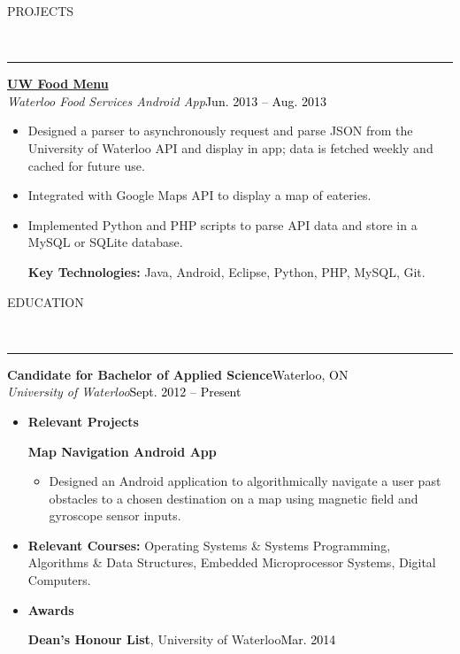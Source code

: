 \documentclass[11pt, letterpaper, oneside]{article}
\newcommand{\HRule}[2]{\textcolor{#1}{\rule{\linewidth}{#2}}}
\newcommand{\sectiontitle}[1]{\begin{minipage}{\textwidth}\vspace{-7.5pt}\begin{flushleft}\hspace{-20.5pt}\vspace{-25pt}
\Large\MakeUppercase{#1}\end{flushleft}\end{minipage}\\\HRule{black}{0.15mm}\vspace{\baselineskip}}
\newenvironment{ressection}[1]{
  \sectiontitle{#1}}
  {\vspace{-\baselineskip}}
\newcommand{\resentryheader}[4]{
    \vspace{-6pt}
    \textbf{#1}\hspace{\stretch{1}}\textcolor{black}{#3}\\
    \textit{#2}\hspace{\stretch{1}}\textcolor{black}{#4}\\
}
\newcommand{\resitem}[1]{
    \vspace{2pt}
    \item \begin{flushleft} #1 \end{flushleft}
}
\newcommand{\resinneritem}[1]{
	\vspace{-5pt}
    \item \begin{flushleft} #1 \end{flushleft}
}
\newcommand{\resawardentry}[3]{
  \begin{minipage}{6.3in}
  \hspace{-24pt}\textbf{#1},
  {#2}\hfill\textcolor{black}{#3}\\
  \vspace{-5pt}
  \vspace{0.5\baselineskip}
  \end{minipage}
}
\newenvironment{resentry}[4]{
  \begin{minipage}{\textwidth}
  \vspace{-3pt}
    \resentryheader{#1}{#2}{#3}{#4}
        \vspace{-\baselineskip}
    \begin{itemize}[noitemsep,nolistsep]
}{
    \end{itemize}
        \vspace{\baselineskip}
        \end{minipage}
}
\begin{document}
\begin{ressection}{Projects}
  \begin{resentry}{\href{https://play.google.com/store/apps/details?id=ca.uwaterloo.uwfoodservices&hl=en}{UW Food Menu}}{Waterloo Food Services Android App}{}{Jun. 2013 -- Aug. 2013}
    \resitem{Designed a parser to asynchronously request and parse JSON from the University of Waterloo API and display in app; data is fetched weekly and cached for future use.}
    \resitem{Integrated with Google Maps API to display a map of eateries.}
    \resitem{Implemented Python and PHP scripts to parse API data and store in a MySQL or SQLite database.}
    \vspace{4pt} \hspace{-15pt}
    \textbf{Key Technologies:} Java, Android, Eclipse, Python, PHP, MySQL, Git.
  \end{resentry}
\end{ressection}

\begin{ressection}{Education}
  \begin{resentry}{Candidate for Bachelor of Applied Science}{University of Waterloo}{Waterloo, ON}{Sept. 2012 -- Present}
    \resitem{\textbf{Relevant Projects}}
	\textbf{\hspace{5pt}Map Navigation Android App} 
	\begin{itemize} 
	\resinneritem{Designed an Android application to algorithmically navigate a user past obstacles to a chosen destination on a map using magnetic field and gyroscope sensor inputs.} 
	\end{itemize}
	\vspace{-4pt}
	\resitem{\textbf{Relevant Courses:} Operating Systems \& Systems Programming, Algorithms \& Data Structures, Embedded Microprocessor Systems, Digital Computers.}
	\resitem{\textbf{Awards}}
	\begin{itemize}
  	\resawardentry{\hspace{5pt} Dean's Honour List}{University of Waterloo}{Mar. 2014}
	\end{itemize}
  \end{resentry}
\end{ressection}
\end{document}
